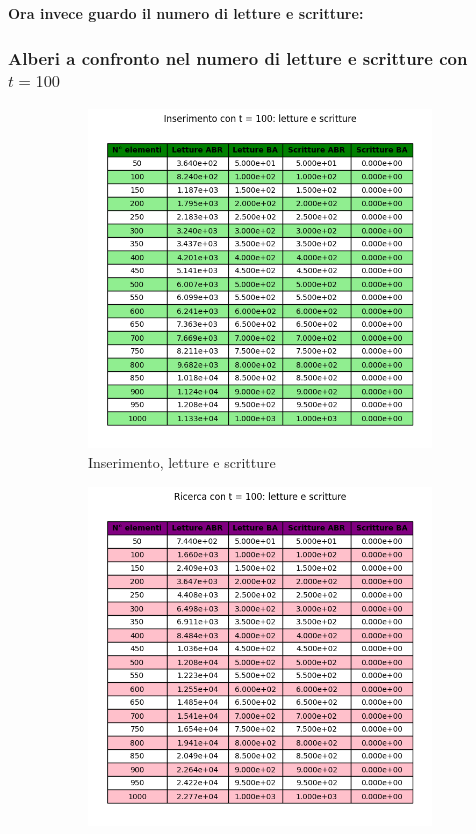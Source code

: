 \textbf{Ora invece guardo il numero di letture e scritture:}

\subsubsection{Alberi a confronto nel numero di letture e scritture con $t = 100$}

\begin{figure}[H]
    \centering
    \begin{subfigure}[b]{0.49\textwidth}
        \centering
        \includegraphics[width=\textwidth]{tables/insert-wr-t100.png}
        \caption{Inserimento, letture e scritture}
        \label{fig:tableinsertwr100}
    \end{subfigure}
    \hfill
    \begin{subfigure}[b]{0.49\textwidth}
        \centering
        \includegraphics[width=\textwidth]{tables/search-wr-t100.png}

\end{subfigure}
\end{figure}
